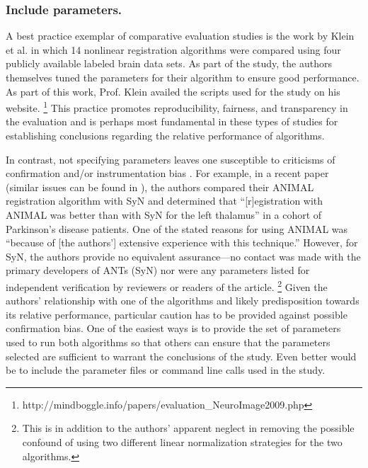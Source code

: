 \documentclass[final,5p,times,twocolumn]{elsarticle}
\begin{document}
\subsubsection{Include parameters.}
A best practice exemplar of comparative evaluation studies
is the work by Klein et al. \cite{Klein2009} in which
14 nonlinear registration algorithms were compared using
four publicly available\added[id=tr]{,} labeled brain  data sets.  
As part of the study, the authors themselves tuned 
the parameters for their algorithm to ensure good
performance.  As
part of this work, Prof. Klein availed the scripts
used for the study on his website.%
\footnote{
http://mindboggle.info/papers/evaluation\_NeuroImage2009.php
}
This practice promotes reproducibility, fairness, and transparency in 
the evaluation and is perhaps most fundamental in these types
of studies for establishing conclusions regarding the relative
performance of algorithms.  

In contrast, not specifying parameters 
leaves one susceptible to criticisms of confirmation and/or 
instrumentation bias \cite{sackett1979}.  For example, in 
a recent paper \cite{haegelen2013} (similar issues can 
be found in \cite{luo2013,wu2013}), the authors compared
their ANIMAL registration algorithm with SyN \cite{avants2011} and determined
that ``[r]egistration with ANIMAL was better than with SyN for 
the left thalamus'' in a cohort of Parkinson's disease patients.
One of the stated reasons for using ANIMAL was ``because of 
[the authors']
extensive experience with this technique.''  However, for SyN,
the authors provide no equivalent assurance---no contact
was made with the primary developers of ANTs (SyN) nor
were any parameters listed for independent verification 
by reviewers or readers of the article.%
\footnote{
This is in addition to the authors' apparent neglect in  
removing the possible confound of using two different linear 
normalization strategies for the two algorithms.
}
Given the authors' relationship with one of the algorithms
and likely predisposition towards its relative performance,
particular caution has to be provided against possible confirmation
bias.  One of the easiest ways is to provide the set of parameters
used to run both algorithms so that others can ensure that 
the parameters selected are sufficient to warrant the conclusions
of the study.  Even better would be to include  the parameter
files or command line calls used in the study.
\end{document}
